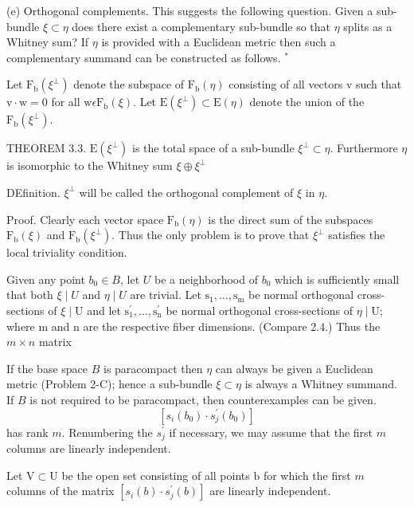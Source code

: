 \documentclass[10pt]{article}
\begin{document}
(e) Orthogonal complements. This suggests the following question. Given a sub-bundle $\xi \subset \eta$ does there exist a complementary sub-bundle so that $\eta$ splits as a Whitney sum? If $\eta$ is provided with a Euclidean metric then such a complementary summand can be constructed as follows. ${ }^{*}$

Let $\mathrm{F}_{\mathrm{b}}\left(\xi^{\perp}\right)$ denote the subspace of $\mathrm{F}_{\mathrm{b}}(\eta)$ consisting of all vectors v such that $\mathrm{v} \cdot \mathrm{w}=0$ for all $\mathrm{w} \epsilon \mathrm{F}_{\mathrm{b}}(\xi)$. Let $\mathrm{E}\left(\xi^{\perp}\right) \subset \mathrm{E}(\eta)$ denote the union of the $\mathrm{F}_{\mathrm{b}}\left(\xi^{\perp}\right)$.

THEOREM 3.3. $\mathrm{E}\left(\xi^{\perp}\right)$ is the total space of a sub-bundle $\xi^{\perp} \subset \eta$. Furthermore $\eta$ is isomorphic to the Whitney sum $\xi \oplus \xi^{\perp}$

DEfinition. $\xi^{\perp}$ will be called the orthogonal complement of $\xi$ in $\eta$.

Proof. Clearly each vector space $\mathrm{F}_{\mathrm{b}}(\eta)$ is the direct sum of the subspaces $\mathrm{F}_{\mathrm{b}}(\xi)$ and $\mathrm{F}_{\mathrm{b}}\left(\xi^{\perp}\right)$. Thus the only problem is to prove that $\xi^{\perp}$ satisfies the local triviality condition.

Given any point $b_{0} \in B$, let $U$ be a neighborhood of $b_{0}$ which is sufficiently small that both $\xi \mid U$ and $\eta \mid U$ are trivial. Let $\mathrm{s}_{1}, \ldots, \mathrm{s}_{\mathrm{m}}$ be normal orthogonal cross-sections of $\xi \mid \mathrm{U}$ and let $\mathrm{s}_{1}^{\prime}, \ldots, \mathrm{s}_{\mathrm{n}}^{\prime}$ be normal orthogonal cross-sections of $\eta \mid \mathrm{U}$; where $\mathrm{m}$ and $\mathrm{n}$ are the respective fiber dimensions. (Compare 2.4.) Thus the $m \times n$ matrix

If the base space $B$ is paracompact then $\eta$ can always be given a Euclidean metric (Problem 2-C); hence a sub-bundle $\xi \subset \eta$ is always a Whitney summand. If $B$ is not required to be paracompact, then counterexamples can be given.
$$
\left[s_{i}\left(b_{0}\right) \cdot s_{j}^{\prime}\left(b_{0}\right)\right]
$$
has rank $m$. Renumbering the $s_{j}^{\prime}$ if necessary, we may assume that the first $m$ columns are linearly independent.

Let $\mathrm{V} \subset \mathrm{U}$ be the open set consisting of all points $\mathrm{b}$ for which the first $m$ columns of the matrix $\left[s_{i}(b) \cdot s_{j}^{\prime}(b)\right]$ are linearly independent.
\end{document}
